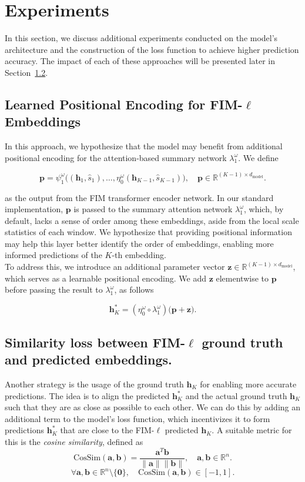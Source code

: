 \documentclass{article}
\theoremstyle{plain}
\theoremstyle{definition}
\theoremstyle{remark}
\begin{document}
\section{Experiments}
In this section, we discuss additional experiments conducted on the model's architecture and the construction of the loss function to achieve higher prediction accuracy. The impact of each of these approaches will be presented later in Section~\ref{}.

\subsection{Learned Positional Encoding for FIM-$\ell$ Embeddings}
In this approach, we hypothesize that the model may benefit from additional positional encoding for the attention-based summary network \(\lambda^{\omega}_1\). We define

\[
    \mathbf{p} =  \psi^{\omega}_1\Big(( \mathbf{h}_1, \hat{s}_1), \ldots, \eta^{\omega}_0( \mathbf{h}_{K-1}, \hat{s}_{K-1})\Big), \quad \mathbf{p} \in \mathbb{R}^{(K-1) \times d_{\text{model}}}.
\]

as the output from the FIM transformer encoder network. In our standard implementation, \(\mathbf{p}\) is passed to the summary attention network \(\lambda^{\omega}_1\), which, by default, lacks a sense of order among these embeddings, aside from the local scale statistics of each window. We hypothesize that providing positional information may help this layer better identify the order of embeddings, enabling more informed predictions of the \(K\)-th embedding.\\
To address this, we introduce an additional parameter vector \(\mathbf{z} \in \mathbb{R}^{(K-1) \times d_{\text{model}}}\), which serves as a learnable positional encoding. We add \(\mathbf{z}\) elementwise to \(\mathbf{p}\) before passing the result to \(\lambda^{\omega}_1\), as follows

\[
    \mathbf{h}^*_K = (\eta^{\omega}_0 \circ \lambda^{\omega}_1) \Big(\mathbf{p} + \mathbf{z} \Big).
\]



\subsection{Similarity loss between FIM-$\ell$ ground truth and predicted embeddings.}
Another strategy is the usage of the ground truth $\mathbf{h}_K$ for enabling more accurate predictions. The idea is to align the predicted $\mathbf{h}^*_K$ and the actual ground truth $\mathbf{h}_K$ such that they are as close as possible to each other. We can do this by adding an additional term to the model's loss function, which incentivizes it to form predictions $\mathbf{h}^*_K$ that are close to the FIM-$\ell$ predicted $\mathbf{h}_K$. A suitable metric for this is the \emph{cosine similarity}, defined as
\[
\text{CosSim}(\mathbf{a}, \mathbf{b}) = \frac{\mathbf{a}^T \mathbf{b}}{\|\mathbf{a}\| \|\mathbf{b}\|}, \quad \mathbf{a}, \mathbf{b} \in \mathbb{R}^n.
\]
\[
\forall \mathbf{a}, \mathbf{b} \in \mathbb{R}^n \setminus \{\mathbf{0}\}, \quad \text{CosSim}(\mathbf{a}, \mathbf{b}) \in [-1, 1].
\]
\end{document}
